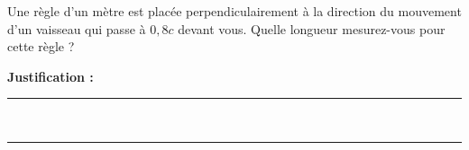 Une règle d'un mètre est placée perpendiculairement à la direction du mouvement d'un vaisseau qui passe à $0{,}8c$ devant vous. Quelle longueur mesurez-vous pour cette règle ?

\choices

\noindent\textbf{Justification :} \hrulefill \\[2.5ex]
\rule{\linewidth}{0.4pt} \\[2.5ex]
\rule{\linewidth}{0.4pt}
\vfill
